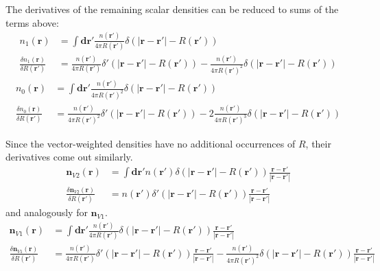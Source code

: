 \documentclass[letterpaper,twocolumn,amsmath,amssymb,jcp,10pt,aip]{revtex4-1}
\begin{document}
The derivatives of the remaining scalar densities can be reduced to
sums of the terms above:
\begin{align}
  n_1(\mathbf{r}) &= \int \mathbf{dr'} \frac{n(\mathbf{r'})}{4\pi R(\mathbf{r'})}
  \delta(|\mathbf{r}-\mathbf{r'}| - R(\mathbf{r'})) \\
  \frac{\delta n_1(\mathbf{r})}{\delta R(\mathbf{r}')}
  &= \frac{n(\mathbf{r'})}{4\pi
    R(\mathbf{r'})}\delta'(|\mathbf{r}-\mathbf{r'}| - R(\mathbf{r'}))
  -
  \frac{n(\mathbf{r'})}{4\pi
    R(\mathbf{r'})^2}\delta(|\mathbf{r}-\mathbf{r'}| - R(\mathbf{r'}))
\end{align}
\begin{align}
  n_0(\mathbf{r}) &= \int \mathbf{dr'} \frac{n(\mathbf{r'})}{4\pi R(\mathbf{r'})^2}
  \delta(|\mathbf{r}-\mathbf{r'}| - R(\mathbf{r'})) \\
  \frac{\delta n_0(\mathbf{r})}{\delta R(\mathbf{r}')}
  &= \frac{n(\mathbf{r'})}{4\pi
    R(\mathbf{r'})^2}\delta'(|\mathbf{r}-\mathbf{r'}| - R(\mathbf{r'}))
  -2
  \frac{n(\mathbf{r'})}{4\pi
    R(\mathbf{r'})^3}\delta(|\mathbf{r}-\mathbf{r'}| - R(\mathbf{r'}))
\end{align}

Since the vector-weighted densities have no additional occurrences of
$R$, their derivatives come out similarly.
\begin{align}
  \mathbf{n}_{V2}(\mathbf{r}) &= \int \mathbf{dr'} n(\mathbf{r'})
  \delta(|\mathbf{r}-\mathbf{r'}| - R(\mathbf{r'}))\frac{\mathbf{r}-\mathbf{r'}}{|\mathbf{r}-\mathbf{r'}|} \\
  \frac{\delta \mathbf{n}_{V2}(\mathbf{r})}{\delta R(\mathbf{r}')}
  &= n(\mathbf{r'})\delta'(|\mathbf{r}-\mathbf{r'}| - R(\mathbf{r'}))
  \frac{\mathbf{r}-\mathbf{r'}}{|\mathbf{r}-\mathbf{r'}|}
\end{align}
and analogously for $\mathbf{n}_{V1}$.
\begin{align}
  \mathbf{n}_{V1}(\mathbf{r}) &= \int \mathbf{dr'}
  \frac{n(\mathbf{r'})}{4\pi R(\mathbf{r'})}
  \delta(|\mathbf{r}-\mathbf{r'}| - R(\mathbf{r'}))\frac{\mathbf{r}-\mathbf{r'}}{|\mathbf{r}-\mathbf{r'}|} \\
  \frac{\delta \mathbf{n}_{V1}(\mathbf{r})}{\delta R(\mathbf{r}')}
  &= \frac{n(\mathbf{r'})}{4\pi R(\mathbf{r'})}\delta'(|\mathbf{r}-\mathbf{r'}| - R(\mathbf{r'}))
  \frac{\mathbf{r}-\mathbf{r'}}{|\mathbf{r}-\mathbf{r'}|} -
  \frac{n(\mathbf{r'})}{4\pi R(\mathbf{r'})^2}\delta(|\mathbf{r}-\mathbf{r'}| - R(\mathbf{r'}))
  \frac{\mathbf{r}-\mathbf{r'}}{|\mathbf{r}-\mathbf{r'}|}
\end{align}
\end{document}
